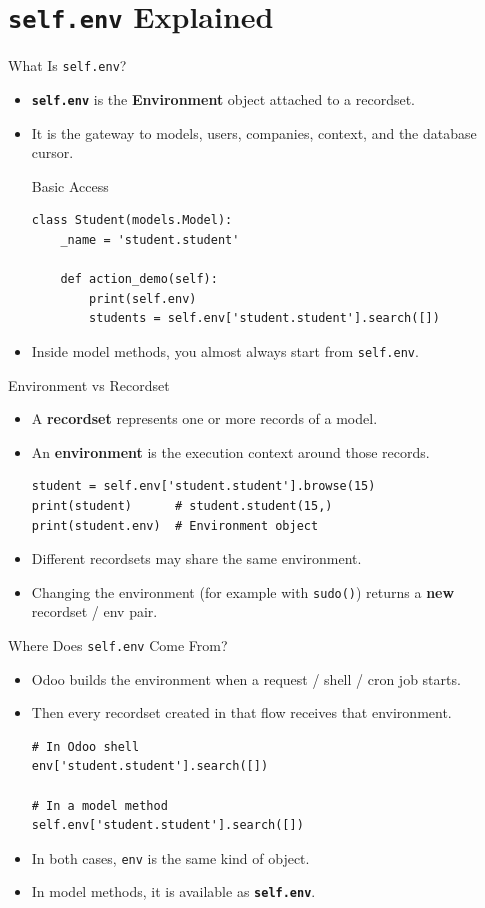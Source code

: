 \section{\textbf{\texttt{self.env}} Explained}

\begin{frame}[fragile]{What Is \texttt{self.env}?}
	\begin{itemize}
		\item \textbf{\texttt{self.env}} is the \textbf{Environment} object attached to a recordset.
		\item It is the gateway to models, users, companies, context, and the database cursor.
\begin{block}{Basic Access}
\begin{lstlisting}
class Student(models.Model):
	_name = 'student.student'

	def action_demo(self):
		print(self.env)
		students = self.env['student.student'].search([])
\end{lstlisting}
\end{block}
		\item Inside model methods, you almost always start from \texttt{self.env}.
	\end{itemize}
\end{frame}

\begin{frame}[fragile]{Environment vs Recordset}
	\begin{itemize}
		\item A \textbf{recordset} represents one or more records of a model.
		\item An \textbf{environment} is the execution context around those records.
\begin{lstlisting}
student = self.env['student.student'].browse(15)
print(student)      # student.student(15,)
print(student.env)  # Environment object
\end{lstlisting}
		\item Different recordsets may share the same environment.
		\item Changing the environment (for example with \texttt{sudo()}) returns a \textbf{new} recordset / env pair.
	\end{itemize}
\end{frame}

\begin{frame}[fragile]{Where Does \texttt{self.env} Come From?}
	\begin{itemize}
		\item Odoo builds the environment when a request / shell / cron job starts.
		\item Then every recordset created in that flow receives that environment.
\begin{lstlisting}
# In Odoo shell
env['student.student'].search([])

# In a model method
self.env['student.student'].search([])
\end{lstlisting}
		\item In both cases, \texttt{env} is the same kind of object.
		\item In model methods, it is available as \textbf{\texttt{self.env}}.
	\end{itemize}
\end{frame}
